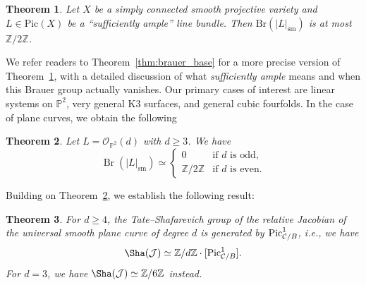 \documentclass[11pt]{amsart}
\theoremstyle{plain}
\newtheorem{thm}{Theorem}[section]
\theoremstyle{definition}
\theoremstyle{remark}
\DeclareMathOperator{\Br}{Br}
\newcommand{\Pic}{\mathop{\rm Pic}\nolimits}
\begin{document}
\begin{thm}\label{thm: br base intro}
    Let $X$ be a simply connected smooth projective variety and $L\in \mathrm{Pic}(X)$ be a ``sufficiently ample'' line bundle. Then $\mathrm{Br}(|L|_\mathrm{sm})$ is at most $\mathbb Z/ 2 \mathbb Z$.
\end{thm}

We refer readers to Theorem~\ref{thm:brauer_base} for a more precise version of Theorem~\ref{thm: br base intro}, with a detailed discussion of what \textit{sufficiently ample} means and when this Brauer group actually vanishes. Our primary cases of interest are linear systems on $\mathbb P^2$, very general K3 surfaces, and general cubic fourfolds. In the case of plane curves, we obtain the following

\begin{thm}\label{thm: brauer P2}
    Let $L = \mathcal{O}_{\mathbb P^2}(d)$ with $d\geq 3$. We have
    \[
    \Br(|L|_\mathrm{sm}) \simeq \begin{cases}0 & \text{if } d \text{ is odd,} \\
    \mathbb Z / 2 \mathbb Z &\text{if } d \text{ is even.}\end{cases}
    \]
\end{thm}

Building on Theorem~\ref{thm: brauer P2}, we establish the following result:

\begin{thm}\label{thm: tate-shafarevich}
    For $d\geq 4$, the Tate--Shafarevich group of the relative Jacobian of the universal smooth plane curve of degree $d$ is generated by $\Pic^1_{\mathcal C / B}$, i.e., we have
    $$\Sha(\mathcal{J}) \simeq \mathbb Z / d \mathbb Z \cdot [\Pic^1_{\mathcal C / B}].$$
    For $d=3$, we have $\Sha(\mathcal{J}) \simeq \mathbb Z/6 \mathbb Z$ instead.
\end{thm}
\end{document}
